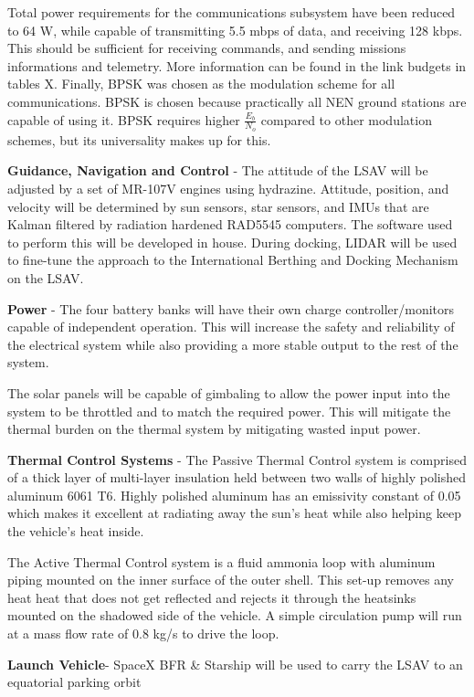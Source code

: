 \documentclass[10pt]{article}
\begin{document}
Total power requirements for the communications subsystem have been
reduced to 64 W, while capable of transmitting 5.5 mbps of data, and
receiving 128 kbps. This should be sufficient for receiving commands,
and sending missions informations and telemetry. More information can
be found in the link budgets in tables X. Finally, BPSK was chosen as
the modulation scheme for all communications. BPSK is chosen because
practically all NEN ground stations are capable of using it. BPSK
requires higher \(\frac{E_b}{N_o}\) compared to other modulation
schemes, but its universality makes up for this.

\textbf{Guidance, Navigation and Control} - The attitude of the LSAV
will be adjusted by a set of MR-107V engines using
hydrazine. Attitude, position, and velocity will be determined by sun
sensors, star sensors, and IMUs that are Kalman filtered by radiation
hardened RAD5545 computers. The software used to perform this will be
developed in house. During docking, LIDAR will be used to fine-tune
the approach to the International Berthing and Docking Mechanism on
the LSAV.

\textbf{Power} - The four battery banks will have their own charge
controller/monitors capable of independent operation. This will
increase the safety and reliability of the electrical system while
also providing a more stable output to the rest of the system.


The solar panels will be capable of gimbaling to allow the power input
into the system to be throttled and to match the required power. This
will mitigate the thermal burden on the thermal system by mitigating
wasted input power.

\textbf{Thermal Control Systems} - The Passive Thermal Control system
is comprised of a thick layer of multi-layer insulation held between
two walls of highly polished aluminum 6061 T6.  Highly polished
aluminum has an emissivity constant of 0.05 which makes it excellent
at radiating away the sun’s heat while also helping keep the vehicle’s
heat inside.

The Active Thermal Control system is a fluid ammonia loop with
aluminum piping mounted on the inner surface of the outer shell.  This
set-up removes any heat heat that does not get reflected and rejects
it through the heatsinks mounted on the shadowed side of the vehicle.
A simple circulation pump will run at a mass flow rate of 0.8 kg/s to
drive the loop.


\textbf{Launch Vehicle}- SpaceX BFR \& Starship will be used to carry the LSAV
to an equatorial parking orbit
\end{document}
